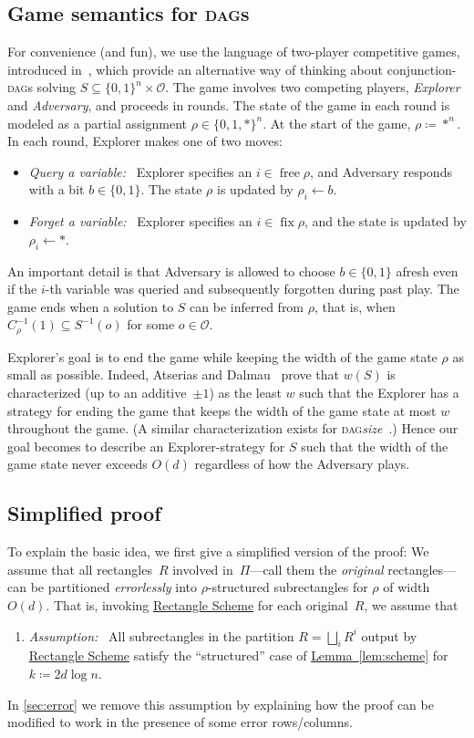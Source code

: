 \documentclass[11pt]{article}
\numberwithin{equation}{section}
\theoremstyle{definition}
\theoremstyle{plain}
\newcommand{\expref}[2]{\hyperref[#2]{#1~\ref{#2}}}
\newcommand{\rectlemma}{\expref{Lemma}{lem:scheme}\xspace}%
\newcommand{\rectscheme}{\hyperref[alg:partition]{Rectangle Scheme}\xspace}
\DeclareMathOperator{\free}{free}
\DeclareMathOperator{\fix}{fix}
\newcommand{\DAGs}{\textsc{dag}s\xspace}
\newcommand{\DAGspace}{\textsc{dag}\xspace}
\newcommand{\calO}{\mathcal{O}}
\begin{document}
\subsection{Game semantics for \DAGs}
For convenience (and fun), we use the language of two-player competitive games, introduced in~\cite{pudlak00proofs,atserias08combinatorial}, which provide an alternative way of thinking about conjunction-\DAGs solving $S\subseteq\{0,1\}^n\times \calO$. The game involves two competing players, \emph{Explorer} and \emph{Adversary}, and proceeds in rounds. The state of the game in each round is modeled as a partial assignment $\rho\in\{0,1,*\}^n$. At the start of the game, $\rho\coloneqq *^n$. In each round, Explorer makes one of two moves:
\begin{itemize}
\item \emph{Query a variable:}~ Explorer specifies an $i\in\free\rho$, and Adversary responds with a bit $b\in\{0,1\}$. The state $\rho$ is updated by $\rho_i \leftarrow b$.
\item \emph{Forget a variable:}~ Explorer specifies an $i\in\fix\rho$, and the state is updated by $\rho_i\leftarrow *$.
\end{itemize}
An important detail is that Adversary is allowed to choose $b\in\{0,1\}$ afresh even if the $i$-th variable was queried and subsequently forgotten during past play. The game ends when a solution to $S$ can be inferred from $\rho$, that is, when $C_\rho^{-1}(1)\subseteq S^{-1}(o)$ for some $o\in \calO$.

Explorer's goal is to end the game while keeping the width of the game state $\rho$ as small as possible. Indeed, Atserias and Dalmau~\cite{atserias08combinatorial} prove that $w(S)$ is characterized (up to an additive~$\pm 1$) as the least $w$ such that the Explorer has a strategy for ending the game that keeps the width of the game state at most $w$ throughout the game. (A similar characterization exists for \DAGspace \emph{size}~\cite{pudlak00proofs}.) Hence our goal becomes to describe an Explorer-strategy for $S$ such that the width of the game state never exceeds $O(d)$ regardless of how the Adversary plays.

\subsection{Simplified proof} \label{sec:simple-proof}

To explain the basic idea, we first give a simplified version of the proof: We assume that all rectangles~$R$ involved in~$\Pi$---call them the \emph{original} rectangles---can be partitioned \emph{errorlessly} into $\rho$-structured subrectangles for $\rho$ of width $O(d)$. That is, invoking \rectscheme for each original~$R$, we assume that
\begin{enumerate}[label=($\bm{*}$)]
\item \label{assumption}
\emph{Assumption:}~ All subrectangles in the partition $R=\bigsqcup_i R^i$ output by \rectscheme satisfy the ``structured'' case of \rectlemma for $k\coloneqq 2d\log n$.
\end{enumerate}
In \autoref{sec:error} we remove this assumption by explaining how the proof can be modified to work in the presence of some error rows/columns.
\end{document}
